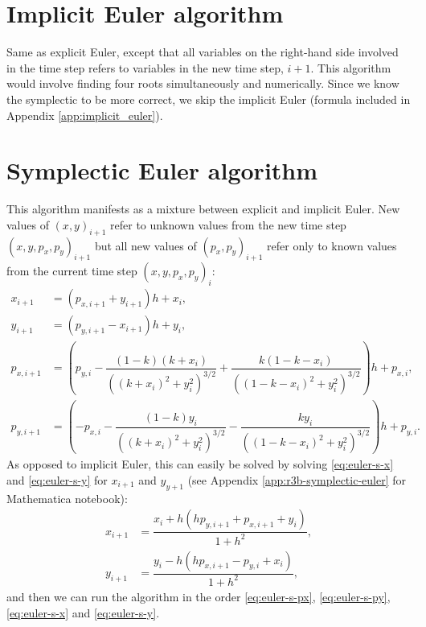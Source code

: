 \section{Implicit Euler algorithm}
Same as explicit Euler, except that all variables on the right-hand side involved in the time step refers to variables in the new time step, $i+1$. This algorithm would involve finding four roots simultaneously and numerically. Since we know the symplectic to be more correct, we skip the implicit Euler (formula included in Appendix \ref{app:implicit_euler}).

\section{Symplectic Euler algorithm}
This algorithm manifests as a mixture between explicit and implicit Euler. New values of $(x,y)_{i+1}$ refer to unknown values from the new time step $(x,y,p_x,p_y)_{i+1}$ but all new values of $(p_x,p_y)_{i+1}$ refer only to known values from the current time step $(x,y,p_x,p_y)_i$:
\begin{align}
x_{i+1} &= (p_{x,i+1} + y_{i+1})h + x_i \label{eq:euler-s-x}, \\[0.2cm]
y_{i+1} &= (p_{y,i+1} - x_{i+1})h + y_i \label{eq:euler-s-y}, \\[0.2cm]
p_{x,i+1} &= \left(p_{y,i} - \dfrac{(1-k)(k+x_i)}{((k+x_i)^2+y_i^2)^{3/2}} + \dfrac{k(1-k-x_i)}{((1-k-x_i)^2+y_i^2)^{3/2}}\right)h + p_{x,i} \label{eq:euler-s-px}, \\[0.2cm]
p_{y,i+1} &= \left(-p_{x,i} - \dfrac{(1-k)y_i}{((k+x_i)^2+y_i^2)^{3/2}} - \dfrac{k y_i}{((1-k-x_i)^2+y_i^2)^{3/2}}\right)h + p_{y,i}. \label{eq:euler-s-py}
\end{align}
As opposed to implicit Euler, this can easily be solved by solving \eqref{eq:euler-s-x} and \eqref{eq:euler-s-y} for $x_{i+1}$ and $y_{y+1}$ (see Appendix \ref{app:r3b-symplectic-euler} for Mathematica notebook):
\begin{align}
x_{i+1} &= \dfrac{x_i + h(h p_{y,i+1} + p_{x,i+1} + y_i)}{1+h^2}, \label{eq:euler_s_x2} \\[0.5cm]
y_{i+1} &= \dfrac{y_i - h(h p_{x,i+1} - p_{y,i} + x_i)}{1+h^2}, \label{eq:euler_s_y2}
\end{align}
and then we can run the algorithm in the order \eqref{eq:euler-s-px}, \eqref{eq:euler-s-py}, \eqref{eq:euler-s-x} and \eqref{eq:euler-s-y}. %

